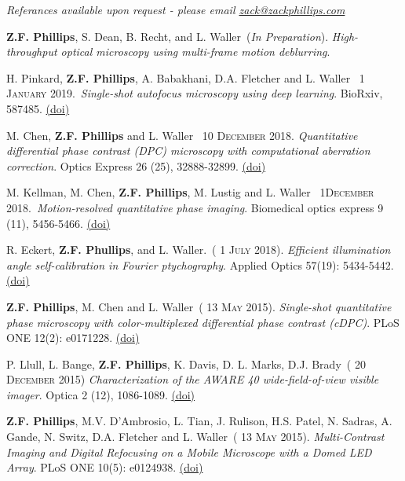 \documentclass[12pt,letterpaper]{article}
\newcommand{\mhead}[1]{\leavevmode\marginpar{\sffamily\footnotesize #1}}
\renewcommand{\date}[1]{{} #1}
\begin{document}
\begin{center}\textit{Referances available upon request - please email \href{mailto:zack@zackphillips.com}{zack@zackphillips.com}}\end{center}

\newpage
\mhead{Publications}%
\par\vspace{-\baselineskip}

\textbf{Z.F. Phillips}, S. Dean, B. Recht, and L. Waller~(\textit{In Preparation}).
\emph{High-throughput optical microscopy using multi-frame motion deblurring}.

\medskip
H. Pinkard, \textbf{Z.F. Phillips}, A. Babakhani, D.A. Fletcher and L. Waller~\date{1 \textsc{January} 2019}.~\emph{Single-shot autofocus microscopy using deep learning}. BioRxiv, 587485. \href{https://doi.org/10.1101/587485}{(doi)}

\medskip
M. Chen, \textbf{Z.F. Phillips} and L. Waller~\date{10 \textsc{December} 2018}. \emph{Quantitative differential phase contrast (DPC) microscopy with computational aberration correction}. Optics Express 26 (25), 32888-32899. \href{https://doi.org/10.1364/OE.26.032888}{(doi)}

\medskip
M. Kellman, M. Chen, \textbf{Z.F. Phillips}, M. Lustig and L. Waller~\date{1\textsc{December} 2018}.~\emph{Motion-resolved quantitative phase imaging}. Biomedical optics express 9 (11), 5456-5466. \href{https://doi.org/10.1364/BOE.9.005456}{(doi)}

\medskip
R. Eckert, \textbf{Z.F. Phullips}, and L. Waller.~(\date{1 \textsc{July} 2018}).
\emph{Efficient illumination angle self-calibration in Fourier ptychography}.
Applied Optics 57(19): 5434-5442. \href{https://doi.org/10.1364/AO.57.005434}{(doi)}

\medskip
\textbf{Z.F. Phillips}, M. Chen and L. Waller~(\date{13 \textsc{May} 2015}).
\emph{Single-shot quantitative phase microscopy with color-multiplexed differential phase contrast (cDPC)}.
PLoS ONE 12(2): e0171228. \href{http://journals.plos.org/plosone/article?id=10.1371/journal.pone.0171228}{(doi)}

\medskip
P. Llull, L. Bange, \textbf{Z.F. Phillips}, K. Davis, D. L. Marks, D.J. Brady~(\date{20 \textsc{December} 2015}) \emph{Characterization of the AWARE 40 wide-field-of-view visible imager}. Optica 2 (12), 1086-1089. \href{https://doi.org/10.1364/OPTICA.2.001086}{(doi)}

\medskip
\textbf{Z.F. Phillips}, M.V. D'Ambrosio, L. Tian, J. Rulison, H.S. Patel, N. Sadras, A. Gande, N. Switz, \linebreak D.A. Fletcher and L. Waller~(\date{13 \textsc{May} 2015}).
\emph{Multi-Contrast Imaging and Digital Refocusing on a Mobile  \linebreak Microscope with a Domed LED Array}.
PLoS ONE 10(5): e0124938. \href{http://journals.plos.org/plosone/article?id=10.1371/journal.pone.0124938}{(doi)}
\end{document}

